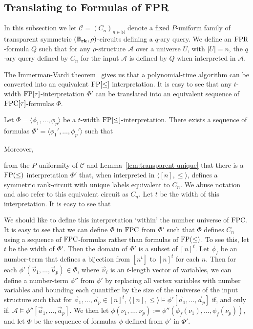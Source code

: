 \documentclass[../paper.tex]{subfiles}
\begin{document}
\subsection{Translating to Formulas of FPR}
\label{sec:translating-formulas-to-FPR}
In this subsection we let $\mathcal{C} = (C_n)_{n \in \mathbb{N}}$ denote a
fixed $P$-uniform family of transparent symmetric $(\mathbb{B}_{\text{\textbf{rk}}}, \rho)$-circuits
defining a $q$-ary query. We define an $\text{\upshape FPR}$-formula $Q$ such that for any
$\rho$-structure $\mathcal{A}$ over a universe $U$, with $\vert U \vert = n$,
the $q$-ary query defined by $C_n$ for the input $\mathcal{A}$ is defined by $Q$
when interpreted in $\mathcal{A}$.

The Immerman-Vardi theorem~\cite{Immerman198686, Vardi:1982} gives us that a
polynomial-time algorithm can be converted into an equivalent $\text{\upshape FP}[\leq]$
interpretation. It is easy to see that any $t$-width $\text{\upshape FP}[\tau]$-interpretation $\Phi'$
can be translated into an equivalent sequence of $\text{\upshape FPC}[\tau]$-formulas $\Phi$.

\begin{lem}
  Let $\Phi = \langle \phi_1, \ldots , \phi_p \rangle$ be a $t$-width
  $\text{\upshape FP}[\leq]$-interpretation. There exists a sequence of formulas $\Phi' =
  \langle \phi_1' , \ldots, \phi_p' \rangle$ such that 
  \end{lem}
Moreover, 

from the $P$-uniformity of $\mathcal{C}$ and
Lemma~\ref{lem:transparent-unique} that there is a $\text{\upshape FP}(\leq)$ interpretation
$\Phi'$ that, when interpreted in $\langle [n], \leq \rangle$, defines a
symmetric rank-circuit with unique labels equivalent to $C_n$. We abuse notation
and also refer to this equivalent circuit as $C_n$. Let $t$ be the width of this
interpretation. It is easy to see that

We should like to define this interpretation `within' the number universe of
$\text{\upshape FPC}$. It is easy to see that we can define $\Phi$ in $\text{\upshape FPC}$ from $\Phi'$ such
that $\Phi$ defines $C_n$ using a sequence of $\text{\upshape FPC}$-formulas rather than formulas
of $\text{\upshape FP}(\leq)$. To see this, let $t$ be the width of $\Phi'$. Then the domain of
$\Phi'$ is a subset of $[n]^t$. Let $\phi_f$ be an number-term that defines a
bijection from $[n^t]$ to $[n]^t$ for each $n$. Then for each $\phi'
(\vec{\nu}_1, \ldots, \vec{\nu}_{p}) \in \Phi$, where $\vec{\nu}_i$ is an
$t$-length vector of variables, we can define a number-term $\phi''$ from
$\phi'$ by replacing all vertex variables with number variables and bounding
each quantifier by the size of the universe of the input structure such that for
$\vec{a}_1, \ldots, \vec{a}_p \in [n]^t$, $\langle [n], \leq \rangle \models
\phi' [\vec{a}_1, \ldots, \vec{a}_p]$ if, and only if, $\mathcal{A} \models
\phi'' [\vec{a}_1, \ldots, \vec{a}_p]$. We then let $\phi(\nu_1, \ldots, \nu_p)
:= \phi''(\phi_f (\nu_1), \ldots, \phi_f(\nu_p))$, and let $\Phi$ be the
sequence of formulas $\phi$ defined from $\phi'$ in $\Phi'$.
\end{document}
